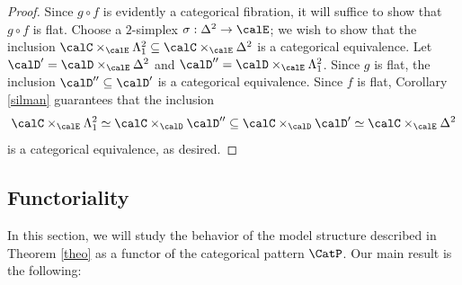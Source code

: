 \begin{proof}
Since $g \circ f$ is evidently a categorical fibration, it will suffice to show that $g \circ f$
is flat. Choose a $2$-simplex $\sigma: \Delta^2 \rightarrow \calE$; we wish to show that
the inclusion $\calC \times_{ \calE} \Lambda^2_1 \subseteq \calC \times_{ \calE} \Delta^2$ is a categorical equivalence. Let $\calD' = \calD \times_{ \calE} \Delta^2$ and
$\calD'' = \calD \times_{ \calE} \Lambda^2_1$. Since $g$ is flat, the inclusion
$\calD'' \subseteq \calD'$ is a categorical equivalence. Since $f$ is flat, Corollary
\ref{silman} guarantees that the inclusion
$$ \calC \times_{ \calE} \Lambda^2_1 \simeq \calC \times_{ \calD} \calD''
\subseteq \calC \times_{ \calD} \calD' \simeq \calC \times_{ \calE} \Delta^2$$ is a categorical equivalence, as desired.
\end{proof}

\subsection{Functoriality}

In this section, we will study the behavior of the model structure described in
Theorem \ref{theo} as a functor of the categorical pattern $\CatP$. Our main result is the following:

